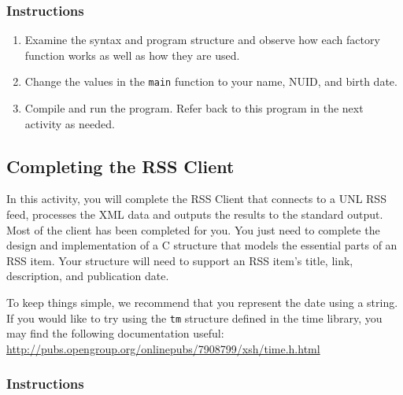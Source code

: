 \documentclass[12pt]{scrartcl}
\begin{document}
\subsubsection*{Instructions}

\begin{enumerate}
  \item Examine the syntax and program structure and observe how 
	each factory function works as well as how they are used.
  \item Change the values in the \texttt{main} function to your 
	name, NUID, and birth date.
  \item Compile and run the program.  Refer back to this program in 
	the next activity as needed.
\end{enumerate}
	
\subsection{Completing the RSS Client}

In this activity, you will complete the RSS Client that connects to a UNL 
RSS feed, processes the XML data and outputs the results to the 
standard output.  Most of the client has been completed for you.  
You just need to complete the design and implementation of a C 
structure that models the essential parts of an RSS item.  Your 
structure will need to support an RSS item's title, link, description, 
and publication date.  

To keep things simple, we recommend that you represent the date using
a string.  If you would like to try using the \texttt{tm} structure 
defined in the time library, you may find the following documentation 
useful: \url{http://pubs.opengroup.org/onlinepubs/7908799/xsh/time.h.html}

\subsubsection*{Instructions}
\end{document}
